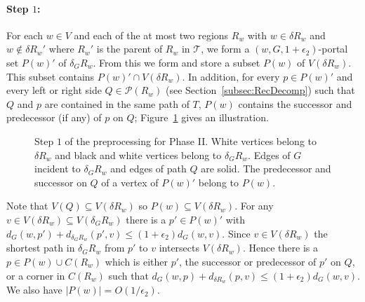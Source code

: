 \documentclass[11pt]{article}
\begin{document}
\paragraph{Step $1$:} For each $w\in V$ and each of the at most two regions $R_w$ with $w\in\delta R_w$ and $w\notin\delta R_w'$ where $R_w'$ is the parent of $R_w$ in $\mathcal T$, we form a $(w,G,1+\epsilon_2)$-portal set $P(w)'$ of $\delta_G R_w$. From this we form and store a subset $P(w)$ of $V(\delta R_w)$. This subset contains $P(w)'\cap V(\delta R_w)$. In addition, for every $p\in P(w)'$ and every left or right side $Q\in\mathcal P(R_w)$ (see Section~\ref{subsec:RecDecomp}) such that $Q$ and $p$ are contained in the same path of $T$, $P(w)$ contains the successor and predecessor (if any) of $p$ on $Q$; Figure~\ref{fig:Pw} gives an illustration.
\begin{figure}\centerline{}
\caption{Step $1$ of the preprocessing for Phase II. White vertices belong to $\delta R_w$ and black and white vertices belong to $\delta_G R_w$. Edges of $G$ incident to $\delta_G R_w$ and edges of path $Q$ are solid. The predecessor and successor on $Q$ of a vertex of $P(w)'$ belong to $P(w)$.}
\label{fig:Pw}
\end{figure}
Note that $V(Q)\subseteq V(\delta R_w)$ so $P(w)\subseteq V(\delta R_w)$. For any $v\in V(\delta R_w)\subseteq V(\delta_G R_w)$ there is a $p'\in P(w)'$ with $d_G(w,p') + d_{\delta_G R_w}(p',v)\leq (1+\epsilon_2)d_G(w,v)$. Since $v\in V(\delta R_w)$ the shortest path in $\delta_G R_w$ from $p'$ to $v$ intersects $V(\delta R_w)$. Hence there is a $p\in P(w)\cup C(R_w)$ which is either $p'$, the successor or predecessor of $p'$ on $Q$, or a corner in $C(R_w)$ such that $d_G(w,p) + d_{\delta R_w}(p,v)\leq (1+\epsilon_2)d_G(w,v)$. We also have $|P(w)| = O(1/\epsilon_2)$.
\end{document}
